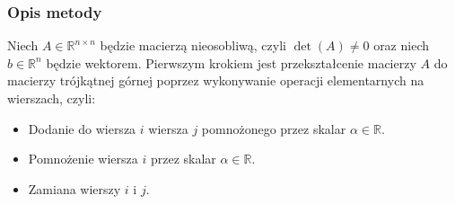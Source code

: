 \documentclass{article}
\begin{document}
\subsubsection{Opis metody}
Niech $A \in \mathbb{R}^{n \times n}$ będzie macierzą nieosobliwą, czyli $\det(A) \neq 0$ oraz niech $b \in \mathbb{R}^{n}$ będzie wektorem. Pierwszym krokiem jest przekształcenie macierzy $A$ do macierzy trójkątnej górnej poprzez wykonywanie operacji elementarnych na wierszach, czyli:
\begin{itemize}
    \item Dodanie do wiersza $i$ wiersza $j$ pomnożonego przez skalar $\alpha \in \mathbb{R}$.
    \item Pomnożenie wiersza $i$ przez skalar $\alpha \in \mathbb{R}$.
    \item Zamiana wierszy $i$ i $j$.
\end{itemize} 
\end{document}
